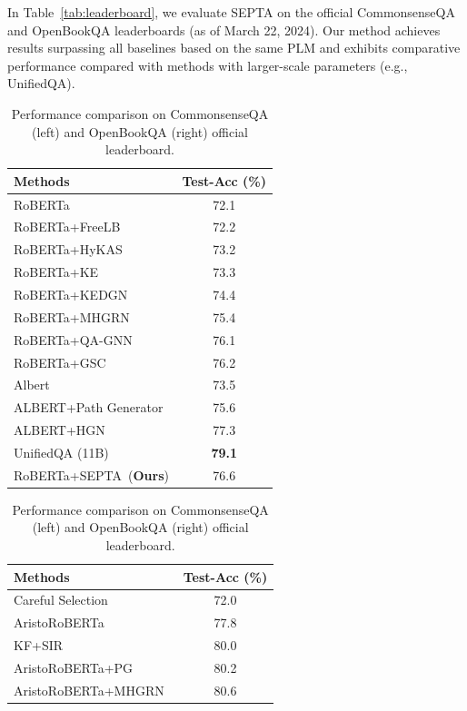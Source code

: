 \documentclass[runningheads]{llncs}
\begin{document}
In Table~\ref{tab:leaderboard}, we evaluate SEPTA on the official CommonsenseQA and OpenBookQA leaderboards (as of March 22, 2024). Our method achieves results surpassing all baselines based on the same PLM and exhibits comparative performance compared with methods with larger-scale parameters (e.g., UnifiedQA).
\begin{table}[t!]
\caption{Performance comparison on CommonsenseQA (left) and OpenBookQA (right) official leaderboard.}
\begin{minipage}[c]{0.48\textwidth}
\centering
\resizebox{\linewidth}{!} {
\begin{tabular}{lc}
\toprule
\textbf{Methods} & \textbf{Test-Acc (\%)}  \\
\midrule
RoBERTa~\cite{ref:roberta}& 72.1 \\
RoBERTa+FreeLB  & 72.2 \\
RoBERTa+HyKAS   & 73.2 \\
RoBERTa+KE   & 73.3 \\
RoBERTa+KEDGN      & 74.4 \\
RoBERTa+MHGRN~\cite{ref:mhgrn}     & 75.4 \\
RoBERTa+QA-GNN~\cite{ref:qagnn}       & 76.1 \\
RoBERTa+GSC~\cite{ref:gsc}   & 76.2 \\
Albert   & 73.5 \\
ALBERT+Path Generator~\cite{ref:pg}        & 75.6 \\
ALBERT+HGN~\cite{ref:mhgrn}       & 77.3 \\
UnifiedQA (11B)~\cite{ref:unifiedqa}      & \textbf{79.1} \\
\midrule
RoBERTa+SEPTA~(\textbf{Ours}) & 76.6 \\
\bottomrule
\end{tabular}
}
\end{minipage}
\begin{minipage}[c]{0.52\textwidth}
\centering
\resizebox{\linewidth}{!} {
\begin{tabular}{lc}
\toprule
\textbf{Methods} & \textbf{Test-Acc (\%)}  \\
\midrule
Careful Selection~\cite{ref:selection}& 72.0 \\
AristoRoBERTa~\cite{ref:aristo}       & 77.8 \\
KF+SIR               & 80.0 \\
AristoRoBERTa+PG~\cite{ref:pg}        & 80.2 \\
AristoRoBERTa+MHGRN~\cite{ref:mhgrn}  & 80.6 \\

\end{tabular}}
\end{minipage}
\end{table}
\end{document}
